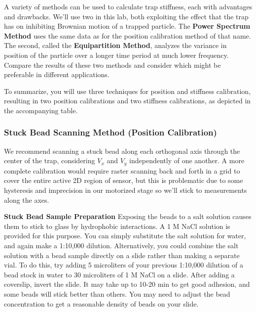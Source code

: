 \documentclass{../lab}
\begin{document}
A variety of methods can be used to calculate trap stiffness, each with advantages and drawbacks. We'll use two in this lab, both exploiting the effect that the trap has on inhibiting Brownian motion of a trapped particle. The \textbf{Power Spectrum Method} uses the same data as for the position calibration method of that name. The second, called the \textbf{Equipartition Method}, analyzes the variance in position of the particle over a longer time period at much lower frequency. Compare the results of these two methods and consider which might be preferable in different applications.

To summarize, you will use three techniques for position and stiffness calibration, resulting in two position calibrations and two stiffness calibrations, as depicted in the accompanying table.

\subsubsection{Stuck Bead Scanning Method (Position Calibration)}

We recommend scanning a stuck bead along each orthogonal axis through the center of the trap, considering $V_x$ and $V_y$ independently of one another. A more complete calibration would require raster scanning back and forth in a grid to cover the entire active 2D region of sensor, but this is problematic due to some hysteresis and imprecision in our motorized stage so we'll stick to measurements along the axes.

\textbf{Stuck Bead Sample Preparation} Exposing the beads to a salt solution causes them to stick to glass by hydrophobic interactions. A 1 M NaCl solution is provided for this purpose. You can simply substitute the salt solution for water, and again make a 1:10,000 dilution. Alternatively, you could combine the salt solution with a bead sample directly on a slide rather than making a separate vial. To do this, try adding 5 microliters of your previous 1:10,000 dilution of a bead stock in water to 30 microliters of 1 M NaCl on a slide. After adding a coverslip, invert the slide. It may take up to 10-20 min to get good adhesion, and some beads will stick better than others. You may need to adjust the bead concentration to get a reasonable density of beads on your slide.
\end{document}
